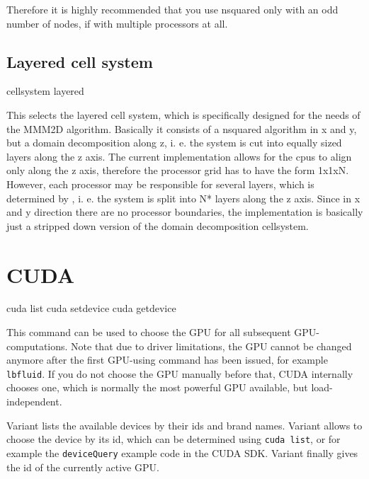 Therefore it is highly recommended that you use nsquared only with an
odd number of nodes, if with multiple processors at all. 

\subsection{Layered cell system}

\begin{pysyntax}
\end{pysyntax}


\begin{essyntax}
  cellsystem layered 
\end{essyntax}

This selects the layered cell system, which is specifically designed
for the needs of the MMM2D algorithm. Basically it consists of a
nsquared algorithm in x and y, but a domain decomposition along z, i.
e. the system is cut into equally sized layers along the z axis. The
current implementation allows for the cpus to align only along the z
axis, therefore the processor grid has to have the form 1x1xN.
However, each processor may be responsible for several layers, which
is determined by , i. e. the system is split into
N* layers along the z axis. Since in x and y direction
there are no processor boundaries, the implementation is basically
just a stripped down version of the domain decomposition cellsystem.

\section{CUDA}
\label{sec:cuda}
\begin{essyntax}
   cuda list
   cuda setdevice 
   cuda getdevice
\end{essyntax}

This command can be used to choose the GPU for all subsequent
GPU-computations. Note that due to driver limitations, the GPU cannot
be changed anymore after the first GPU-using command has been issued,
for example \texttt{lbfluid}. If you do not choose the GPU manually
before that, CUDA internally chooses one, which is normally the most
powerful GPU available, but load-independent.

Variant  lists the available devices by their ids and brand
names. Variant  allows to choose the device by its id,
which can be determined using \texttt{cuda list}, or for example the
\texttt{deviceQuery} example code in the CUDA SDK. Variant 
finally gives the id of the currently active GPU.


